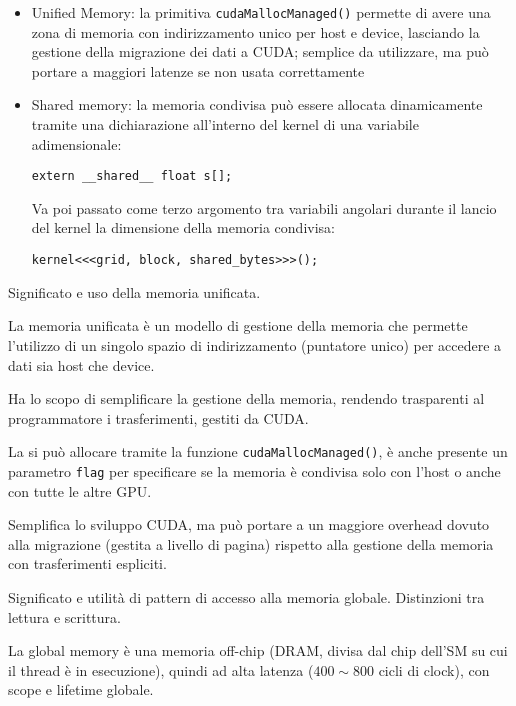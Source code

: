 \begin{questions}
\begin{solution}
\begin{itemize}
            \item Unified Memory: la primitiva \texttt{cudaMallocManaged()} permette di avere una zona di memoria con indirizzamento unico per host e device, lasciando la gestione della migrazione dei dati a CUDA; semplice da utilizzare, ma può portare a maggiori latenze se non usata correttamente
            
            \item Shared memory: la memoria condivisa può essere allocata dinamicamente tramite una dichiarazione all'interno del kernel di una variabile adimensionale:
            \begin{verbatim}
extern __shared__ float s[];
            \end{verbatim}
            Va poi passato come terzo argomento tra variabili angolari durante il lancio del kernel la dimensione della memoria condivisa:
            \begin{verbatim}
kernel<<<grid, block, shared_bytes>>>();
            \end{verbatim}
        \end{itemize}
    \end{solution}
    
    \question Significato e uso della memoria unificata.
    
    \begin{solution}
        La memoria unificata è un modello di gestione della memoria che permette l'utilizzo di un singolo spazio di indirizzamento (puntatore unico) per accedere a dati sia host che device. 
        
        Ha lo scopo di semplificare la gestione della memoria, rendendo trasparenti al programmatore i trasferimenti, gestiti da CUDA. 
        
        La si può allocare tramite la funzione \texttt{cudaMallocManaged()}, è anche presente un parametro \texttt{flag} per specificare se la memoria è condivisa solo con l'host o anche con tutte le altre GPU.
        
        Semplifica lo sviluppo CUDA, ma può portare a un maggiore overhead dovuto alla migrazione (gestita a livello di pagina) rispetto alla gestione della memoria con trasferimenti espliciti.
    \end{solution}
    
    \question Significato e utilità di pattern di accesso alla memoria globale. Distinzioni tra lettura e scrittura.
    
    \begin{solution}
        La global memory è una memoria off-chip (DRAM, divisa dal chip dell'SM su cui il thread è in esecuzione), quindi ad alta latenza ($400\sim 800$ cicli di clock), con scope e lifetime globale. 
        

\end{solution}
\end{questions}
